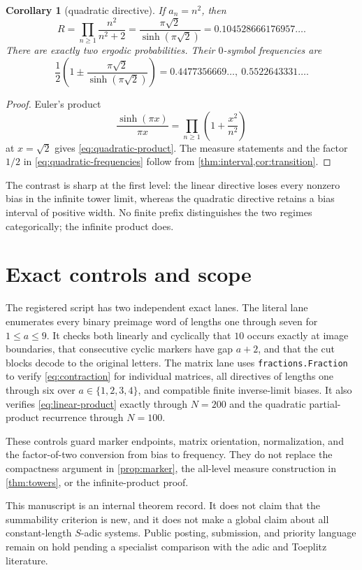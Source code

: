 \documentclass[11pt,a4paper]{amsart}
\newtheorem{corollary}[theorem]{Corollary}
\theoremstyle{definition}
\theoremstyle{remark}
\begin{document}
\begin{corollary}[quadratic directive]\label{cor:quadratic}
If $a_n=n^2$, then
\begin{equation}\label{eq:quadratic-product}
 R=\prod_{n\geq1}\frac{n^2}{n^2+2}
 =\frac{\pi\sqrt2}{\sinh(\pi\sqrt2)}
 =0.104528666176957\ldots.
\end{equation}
There are exactly two ergodic probabilities.  Their $0$-symbol frequencies
are
\begin{equation}\label{eq:quadratic-frequencies}
 \frac12\left(1\pm\frac{\pi\sqrt2}{\sinh(\pi\sqrt2)}\right)
 =0.4477356669\ldots,
   \ 0.5522643331\ldots.
\end{equation}
\end{corollary}

\begin{proof}
Euler's product
\[
 \frac{\sinh(\pi x)}{\pi x}
 =\prod_{n\geq1}\left(1+\frac{x^2}{n^2}\right)
\]
at $x=\sqrt2$ gives \eqref{eq:quadratic-product}.  The measure statements
and the factor $1/2$ in \eqref{eq:quadratic-frequencies} follow from
\cref{thm:interval,cor:transition}.
\end{proof}

The contrast is sharp at the first level: the linear directive loses every
nonzero bias in the infinite tower limit, whereas the quadratic directive
retains a bias interval of positive width.  No finite prefix distinguishes
the two regimes categorically; the infinite product does.

\section{Exact controls and scope}

The registered script has two independent exact lanes.  The literal lane
enumerates every binary preimage word of lengths one through seven for
$1\leq a\leq9$.  It checks both linearly and cyclically that $10$ occurs
exactly at image boundaries, that consecutive cyclic markers have gap
$a+2$, and that the cut blocks decode to the original letters.  The matrix
lane uses \texttt{fractions.Fraction} to verify
\eqref{eq:contraction} for individual matrices, all directives of lengths
one through six over $a\in\{1,2,3,4\}$, and compatible finite inverse-limit
biases.  It also verifies \eqref{eq:linear-product} exactly through
$N=200$ and the quadratic partial-product recurrence through $N=100$.

These controls guard marker endpoints, matrix orientation, normalization,
and the factor-of-two conversion from bias to frequency.  They do not
replace the compactness argument in \cref{prop:marker}, the all-level measure
construction in \cref{thm:towers}, or the infinite-product proof.

This manuscript is an internal theorem record.  It does not claim that the
summability criterion is new, and it does not make a global claim about all
constant-length $S$-adic systems.  Public posting, submission, and priority
language remain on hold pending a specialist comparison with the adic and
Toeplitz literature.



\end{document}
